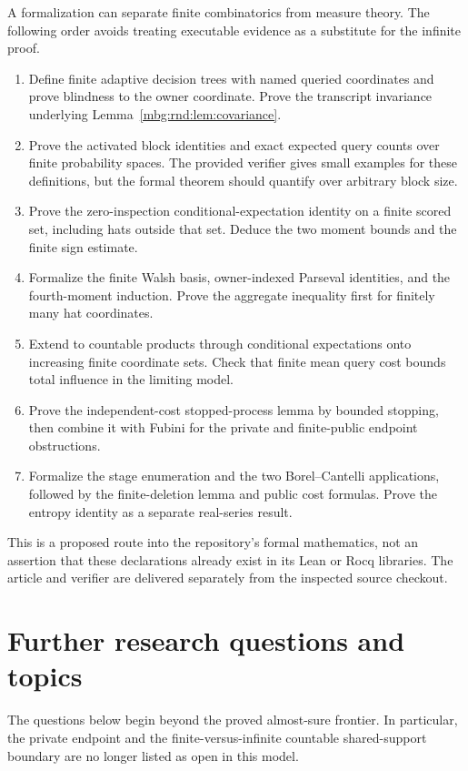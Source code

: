 \documentclass[11pt,letterpaper]{article}
\theoremstyle{definition}
\begin{document}
A formalization can separate finite combinatorics from measure theory.
The following order avoids treating executable evidence as a substitute
for the infinite proof.
\begin{enumerate}
\item Define finite adaptive decision trees with named queried
coordinates and prove blindness to the owner coordinate. Prove the
transcript invariance underlying Lemma~\ref{mbg:rnd:lem:covariance}.
\item Prove the activated block identities and exact expected query
counts over finite probability spaces. The provided verifier gives
small examples for these definitions, but the formal theorem should
quantify over arbitrary block size.
\item Prove the zero-inspection conditional-expectation identity on a
finite scored set, including hats outside that set. Deduce the two
moment bounds and the finite sign estimate.
\item Formalize the finite Walsh basis, owner-indexed Parseval
identities, and the fourth-moment induction. Prove the aggregate
inequality first for finitely many hat coordinates.
\item Extend to countable products through conditional expectations
onto increasing finite coordinate sets. Check that finite mean query
cost bounds total influence in the limiting model.
\item Prove the independent-cost stopped-process lemma by bounded
stopping, then combine it with Fubini for the private and finite-public
endpoint obstructions.
\item Formalize the stage enumeration and the two Borel--Cantelli
applications, followed by the finite-deletion lemma and public cost
formulas. Prove the entropy identity as a separate real-series result.
\end{enumerate}

This is a proposed route into the repository's formal mathematics,
not an assertion that these declarations already exist in its Lean or
Rocq libraries. The article and verifier are delivered separately from
the inspected source checkout.

\section{Further research questions and topics}
\label{mbg:rnd:sec:future}

The questions below begin beyond the proved almost-sure frontier. In
particular, the private endpoint and the finite-versus-infinite
countable shared-support boundary are no longer listed as open in
this model.
\end{document}
